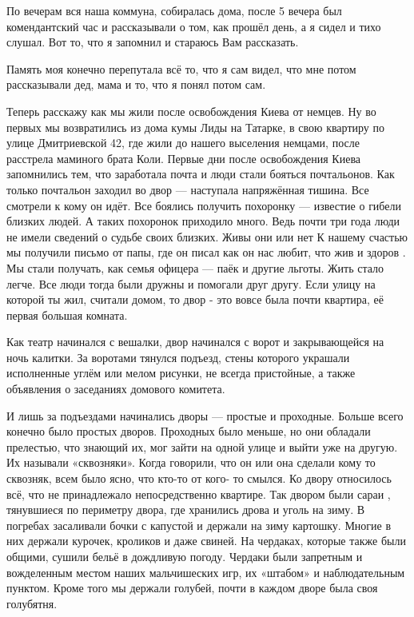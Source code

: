 По вечерам вся  наша коммуна,  собиралась дома, после 5 вечера был
комендантский час и рассказывали о том, как прошёл день, а я сидел и тихо
слушал. Вот то, что я запомнил и стараюсь Вам рассказать.

Память моя конечно перепутала всё то, что я сам видел, что мне потом
рассказывали дед, мама и то, что я понял потом сам.

Теперь расскажу как мы жили после освобождения Киева от немцев. Ну во первых мы
возвратились из дома кумы Лиды на Татарке,   в свою квартиру по улице
Дмитриевской 42, где жили до нашего выселения немцами, после расстрела маминого
брата Коли.  Первые дни после освобождения Киева запомнились тем, что
заработала почта и люди стали бояться почтальонов. Как только почтальон заходил
во двор — наступала напряжённая тишина. Все смотрели к кому он  идёт. Все
боялись получить похоронку — известие о гибели близких людей. А таких похоронок
приходило много. Ведь почти три года люди не имели сведений о судьбе своих
близких. Живы они или нет К нашему счастью мы получили письмо от папы, где он
писал как он нас любит, что жив и здоров . Мы стали получать, как семья офицера
— паёк и другие льготы. Жить стало легче. Все люди тогда были дружны и помогали
друг другу. Если улицу на которой ты жил, считали домом, то двор  -  это вовсе
была почти квартира, её первая большая комната.

Как театр начинался с вешалки, двор начинался с ворот и закрывающейся на ночь
калитки. За воротами тянулся подъезд, стены которого  украшали исполненные
углём или мелом рисунки, не всегда пристойные, а также объявления о заседаниях
домового комитета. 

И лишь за подъездами начинались дворы — простые и проходные. Больше всего
конечно было простых дворов. Проходных было меньше, но они обладали прелестью,
что знающий их, мог  зайти на одной улице и выйти уже на другую. Их называли
«сквозняки». Когда говорили, что он или она сделали  кому то  сквозняк, всем
было ясно, что кто-то от кого- то смылся. Ко двору относилось всё, что не
принадлежало  непосредственно квартире. Так двором  были сараи , тянувшиеся по
периметру двора, где хранились дрова и уголь на зиму.  В погребах засаливали
бочки с капустой и держали  на зиму картошку.  Многие в них держали курочек,
кроликов и даже свиней. На чердаках, которые также были общими, сушили бельё в
дождливую погоду. Чердаки были запретным и вожделенным местом наших
мальчишеских игр, их «штабом» и наблюдательным пунктом. Кроме того мы держали
голубей,  почти в каждом дворе была своя голубятня. 

